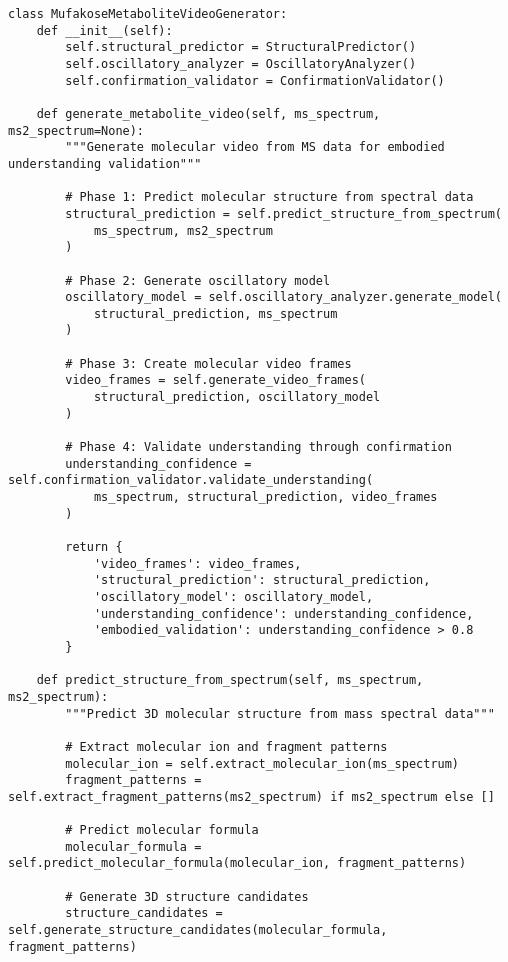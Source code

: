 \documentclass[12pt,a4paper]{article}
\begin{document}
\begin{lstlisting}[style=pythonstyle, caption=Metabolite Video Reconstruction for Embodied Understanding]
class MufakoseMetaboliteVideoGenerator:
    def __init__(self):
        self.structural_predictor = StructuralPredictor()
        self.oscillatory_analyzer = OscillatoryAnalyzer()
        self.confirmation_validator = ConfirmationValidator()
        
    def generate_metabolite_video(self, ms_spectrum, ms2_spectrum=None):
        """Generate molecular video from MS data for embodied understanding validation"""
        
        # Phase 1: Predict molecular structure from spectral data
        structural_prediction = self.predict_structure_from_spectrum(
            ms_spectrum, ms2_spectrum
        )
        
        # Phase 2: Generate oscillatory model
        oscillatory_model = self.oscillatory_analyzer.generate_model(
            structural_prediction, ms_spectrum
        )
        
        # Phase 3: Create molecular video frames
        video_frames = self.generate_video_frames(
            structural_prediction, oscillatory_model
        )
        
        # Phase 4: Validate understanding through confirmation
        understanding_confidence = self.confirmation_validator.validate_understanding(
            ms_spectrum, structural_prediction, video_frames
        )
        
        return {
            'video_frames': video_frames,
            'structural_prediction': structural_prediction,
            'oscillatory_model': oscillatory_model,
            'understanding_confidence': understanding_confidence,
            'embodied_validation': understanding_confidence > 0.8
        }
    
    def predict_structure_from_spectrum(self, ms_spectrum, ms2_spectrum):
        """Predict 3D molecular structure from mass spectral data"""
        
        # Extract molecular ion and fragment patterns
        molecular_ion = self.extract_molecular_ion(ms_spectrum)
        fragment_patterns = self.extract_fragment_patterns(ms2_spectrum) if ms2_spectrum else []
        
        # Predict molecular formula
        molecular_formula = self.predict_molecular_formula(molecular_ion, fragment_patterns)
        
        # Generate 3D structure candidates
        structure_candidates = self.generate_structure_candidates(molecular_formula, fragment_patterns)
        

\end{lstlisting}
\end{document}
